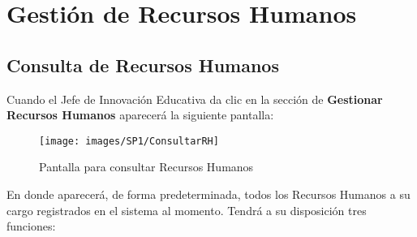 \chapter{Gestión de Recursos Humanos}
\section{Consulta de Recursos Humanos}
Cuando el Jefe de Innovación Educativa da clic en la sección de \textbf{Gestionar Recursos Humanos} aparecerá la siguiente pantalla:

\begin{figure}[!hbtp]
	\centering
	\hypertarget{consultarrh}{\texttt{[image: images/SP1/ConsultarRH]}}
	\caption{Pantalla para consultar Recursos Humanos}
	\label{consultarrh}
\end{figure}

En donde aparecerá, de forma predeterminada, todos los Recursos Humanos a su cargo registrados en el sistema al momento. Tendrá a su disposición tres funciones:

